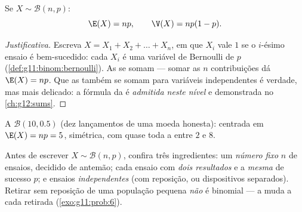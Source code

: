 \begin{proposition}\label{prop:g11:binom:expectation}
Se $X \sim \mathcal B(n, p)$:
\[
\E(X) = np,
\qquad
\V(X) = np(1-p).
\]
\end{proposition}

\begin{proof}[Justificativa]
Escreva $X = X_1 + X_2 + \dots + X_n$, em que $X_i$ vale $1$ se o
$i$-ésimo ensaio é bem-sucedido: cada $X_i$ é uma variável de Bernoulli
de  $p$ (\cref{def:g11:binom:bernoulli}). As  se somam ---
somar as $n$ contribuições dá $\E(X) = np$. Que as \emph{}
também se somam para variáveis independentes é verdade, mas mais
delicado: a fórmula da  é \emph{admitida neste nível} e
demonstrada no \cref{ch:g12:sums}.
\end{proof}

\begin{omfigure}

{\small A  $\mathcal B(10, 0.5)$ (dez lançamentos de uma
moeda honesta): centrada em $\E(X) = np = 5$, simétrica, com quase toda a
 entre $2$ e $8$.}
\end{omfigure}

\begin{method}\label{met:g11:binom:recognize}
Antes de escrever $X \sim \mathcal B(n, p)$, confira três ingredientes:
um \emph{número fixo} $n$ de ensaios, decidido de antemão; cada ensaio
com \emph{dois resultados} e a \emph{mesma}  de sucesso $p$;
e ensaios \emph{independentes} (com reposição, ou dispositivos
separados). Retirar sem reposição de uma população pequena \emph{não} é
binomial --- a  muda a cada retirada
(\cref{exo:g11:prob:6}).
\end{method}

